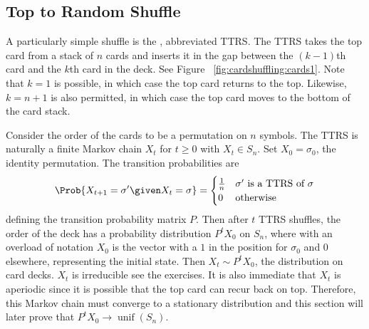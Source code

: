 \documentclass[12pt]{article}
\begin{document}
\subsection*{Top to Random Shuffle} A particularly simple shuffle is the
,%
abbreviated TTRS\@.  The TTRS takes the top card from a stack of \( n \)
cards and inserts it in the gap between the \( (k-1) \)th card and the \(
k \)th card in the deck.  See Figure~%
\ref{fig:cardshuffling:cards1}.  Note that \( k = 1 \) is possible, in
which case the top card returns to the top.  Likewise, \( k = n+1 \) is
also permitted, in which case the top card moves to the bottom of the
card stack.

Consider the order of the cards to be a permutation on \( n \) symbols.
The TTRS is naturally a finite Markov chain \( X_t \) for \( t \ge 0 \)
with \( X_t \in S_n \).  Set \( X_0 = \sigma_0 \), the identity
permutation.  The transition probabilities are
\[
    \Prob{X_{t+1} = \sigma' \given X_t = \sigma} =
    \begin{cases}
        \frac{1}{n} & \text{\( \sigma' \) is a TTRS of \( \sigma \)}\\
        0 & \text{otherwise}
    \end{cases}
\] defining the transition probability matrix \( P \). Then after \( t \)
TTRS shuffles, the order of the deck has a probability distribution \( 
P^t X_0 \) on \( S_n \), where with an overload of notation \( X_0
\) is the vector with a \( 1 \) in the position for \( \sigma_0 \) and
\( 0 \) elsewhere, representing the initial state.
Then \( X_t \sim P^t X_0 \), the distribution on card decks. \( X_t \)
is irreducible see the exercises.  It is also immediate that \( X_t \)
is aperiodic since it is possible that the top card can recur back on
top.  Therefore, this Markov chain must converge to a stationary
distribution and this section will later prove that \( P^t X_0 \to
\operatorname{unif}
(S_n) \).
\end{document}
